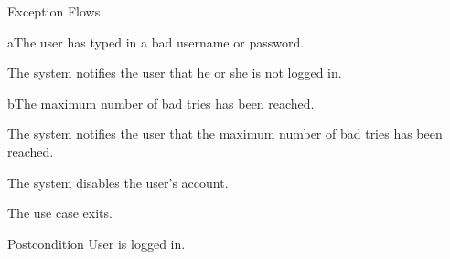 \begin{cpartList}{Exception Flows}
\begin{innerList}{8}{a}{The user has typed in a bad username or password.}
\item The system notifies the user that he or she is not logged in.
\end{innerList}
\begin{innerList}{8}{b}{The maximum number of bad tries has been reached.}
  \item The system notifies the user that the maximum number of bad tries has been reached.
  \item The system disables the user's account.
  \item The use case exits.
\end{innerList}
\end{cpartList}

\begin{cpart}{Postcondition}
User is logged in.
\end{cpart}

